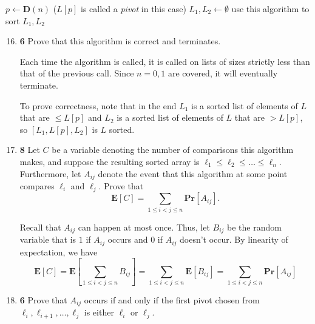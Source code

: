 \documentclass[12pt]{article}
\theoremstyle{plain}
\theoremstyle{definition}
\theoremstyle{remark}
\renewcommand{\Pr}{\textbf{Pr}}
\newcommand{\E}{\textbf{E}}
\newcommand{\pts}[1]{\lbrack\textbf{#1}\rbrack}
\begin{document}
\newpage

\begin{algorithm}
\DontPrintSemicolon
{}
$p\gets\textbf{D}(n)$ ($L[p]$ is called a \emph{pivot} in this case)\;
$L_1,L_2\gets\emptyset$\;
use this algorithm to sort $L_1,L_2$\;
\Return{$[L_1,L[p],L_2]$}\;
\end{algorithm}

\begin{enumerate}
\setcounter{enumi}{15}

\item \pts{6} Prove that this algorithm is correct and terminates.

\begin{tcolorbox}
Each time the algorithm is called, it is called on lists of sizes strictly less than that of the previous call. Since $n=0,1$ are covered, it will eventually terminate.

To prove correctness, note that in the end $L_1$ is a sorted list of elements of $L$ that are $\le L[p]$ and $L_2$ is a sorted list of elements of $L$ that are $>L[p]$, so $[L_1,L[p],L_2]$ is $L$ sorted.
\end{tcolorbox}

\item \pts{8} Let $C$ be a variable denoting the number of comparisons this algorithm makes, and suppose the resulting sorted array is $\ell_1\le\ell_2\le\dots\le\ell_n$. Furthermore, let $A_{ij}$ denote the event that this algorithm at some point compares $\ell_i$ and $\ell_j$. Prove that \[\E[C]=\sum_{1\le i<j\le n}\Pr[A_{ij}].\]

\begin{tcolorbox}
Recall that $A_{ij}$ can happen at most once. Thus, let $B_{ij}$ be the random variable that is $1$ if $A_{ij}$ occurs and $0$ if $A_{ij}$ doesn't occur. By linearity of expectation, we have \[\E[C]=\E\left[\sum_{1\le i<j\le n}B_{ij}\right]=\sum_{1\le i<j\le n}\E[B_{ij}]=\sum_{1\le i<j\le n}\Pr[A_{ij}]\]
\end{tcolorbox}

\item \pts{6} Prove that $A_{ij}$ occurs if and only if the first pivot chosen from $\ell_i,\ell_{i+1},\dots,\ell_j$ is either $\ell_i$ or $\ell_j$.


\end{enumerate}
\end{document}
